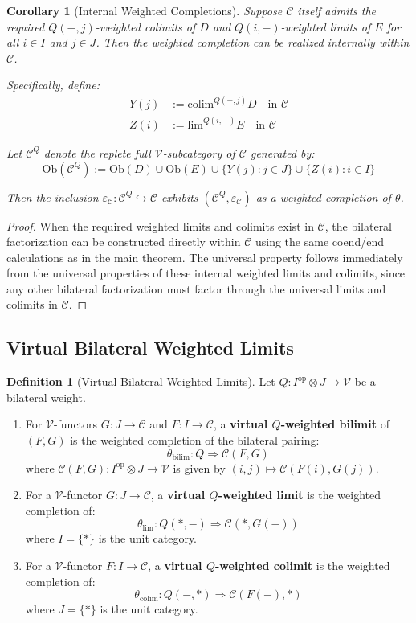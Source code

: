 \documentclass[11pt]{article}
\theoremstyle{plain}
\newtheorem{corollary}[theorem]{Corollary}
\theoremstyle{definition}
\newtheorem{definition}[theorem]{Definition}
\theoremstyle{remark}
\newcommand{\V}{\mathcal{V}}
\newcommand{\C}{\mathcal{C}}
\newcommand{\op}{\mathrm{op}}
\newcommand{\colim}{\mathrm{colim}}
\renewcommand{\lim}{\mathrm{lim}}
\begin{document}
\begin{corollary}[Internal Weighted Completions]\label{cor:internal-weighted completion}
Suppose $\C$ itself admits the required $Q(-, j)$-weighted colimits of $D$ and $Q(i, -)$-weighted limits of $E$ for all $i \in I$ and $j \in J$. Then the weighted completion can be realized internally within $\C$.

Specifically, define:
\begin{align}
Y(j) &:= \colim^{Q(-, j)} D \quad \text{in } \C \\
Z(i) &:= \lim^{Q(i, -)} E \quad \text{in } \C
\end{align}

Let $\C^Q$ denote the replete full $\V$-subcategory of $\C$ generated by:
$$\mathrm{Ob}(\C^Q) := \mathrm{Ob}(D) \cup \mathrm{Ob}(E) \cup \{Y(j) : j \in J\} \cup \{Z(i) : i \in I\}$$

Then the inclusion $\varepsilon_\C : \C^Q \hookrightarrow \C$ exhibits $(\C^Q, \varepsilon_\C)$ as a weighted completion of $\theta$.
\end{corollary}

\begin{proof}
When the required weighted limits and colimits exist in $\C$, the bilateral factorization can be constructed directly within $\C$ using the same coend/end calculations as in the main theorem. The universal property follows immediately from the universal properties of these internal weighted limits and colimits, since any other bilateral factorization must factor through the universal limits and colimits in $\C$.
\end{proof}

\subsection{Virtual Bilateral Weighted Limits}

\begin{definition}[Virtual Bilateral Weighted Limits]\label{def:virtual-limits}
Let $Q : I^{\op} \otimes J \to \V$ be a bilateral weight.

\begin{enumerate}
\item For $\V$-functors $G : J \to \C$ and $F : I \to \C$, a \textbf{virtual $Q$-weighted bilimit} of $(F, G)$ is the weighted completion of the bilateral pairing:
$$\theta_{\mathrm{bilim}} : Q \Rightarrow \C(F, G)$$
where $\C(F, G) : I^{\op} \otimes J \to \V$ is given by $(i, j) \mapsto \C(F(i), G(j))$.

\item For a $\V$-functor $G : J \to \C$, a \textbf{virtual $Q$-weighted limit} is the weighted completion of:
$$\theta_{\lim} : Q(\ast, -) \Rightarrow \C(\ast, G(-))$$
where $I = \{\ast\}$ is the unit category.

\item For a $\V$-functor $F : I \to \C$, a \textbf{virtual $Q$-weighted colimit} is the weighted completion of:
$$\theta_{\colim} : Q(-, \ast) \Rightarrow \C(F(-), \ast)$$
where $J = \{\ast\}$ is the unit category.
\end{enumerate}
\end{definition}
\end{document}
